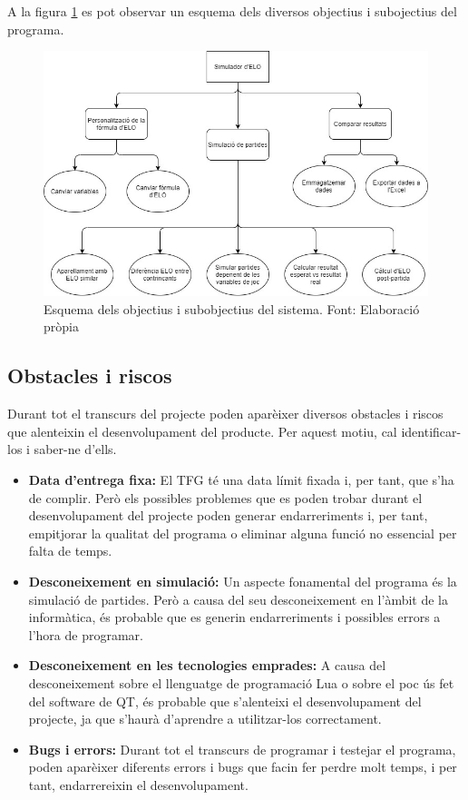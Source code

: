 \documentclass[a4paper]{article}
\begin{document}
A la figura \ref{fig:EsquemaObjectius} es pot observar un esquema dels diversos objectius i subojectius del programa.

\begin{figure}[H]
    \centering
    \includegraphics[width=1.15\textwidth]{images/FuncionsEsquema.jpg}
    \caption[Esquema dels objectius i subobjectius del sistema]{Esquema dels objectius i subobjectius del sistema. Font: Elaboració pròpia}
    \label{fig:EsquemaObjectius}
\end{figure}

\subsection{Obstacles i riscos}
Durant tot el transcurs del projecte poden aparèixer diversos obstacles i riscos que alenteixin el desenvolupament del producte. Per aquest motiu, cal identificar-los i saber-ne d'ells.

\begin{itemize}
    \item \textbf{Data d'entrega fixa:} El TFG té una data límit fixada i, per tant, que s'ha de complir. Però els possibles problemes que es poden trobar durant el desenvolupament del projecte poden generar endarreriments i, per tant, empitjorar la qualitat del programa o eliminar alguna funció no essencial per falta de temps.
    \item \textbf{Desconeixement en simulació:} Un aspecte fonamental del programa és la simulació de partides. Però a causa del seu desconeixement en l'àmbit de la informàtica, és probable que es generin endarreriments i possibles errors a l'hora de programar.
    \item \textbf{Desconeixement en les tecnologies emprades:} A causa del desconeixement sobre el llenguatge de programació Lua o sobre el poc ús fet del software de QT, és probable que s'alenteixi el desenvolupament del projecte, ja que s'haurà d'aprendre a utilitzar-los correctament.
    \item \textbf{Bugs i errors:} Durant tot el transcurs de programar i testejar el programa, poden aparèixer diferents errors i bugs que facin fer perdre molt temps, i per tant, endarrereixin el desenvolupament.
\end{itemize}
\end{document}
